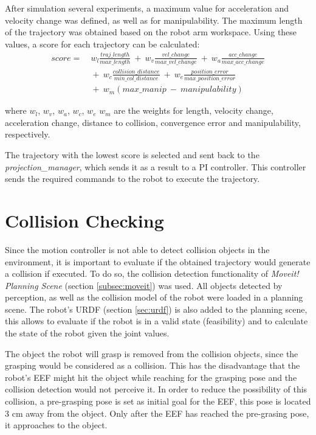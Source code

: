 After simulation several experiments, a maximum value for acceleration and velocity change was defined, as well as for manipulability. The maximum length of the trajectory was obtained based on the robot arm workspace. Using these values, a score for each trajectory can be calculated:
\begin{equation}
\begin{aligned}
score = &\ w_l\frac{traj\_length}{max\_length}\ +\ w_v\frac{vel\_change}{max\_vel\_change}\ +\ w_a\frac{acc\_change}{max\_acc\_change} \\
 & \ +\ w_c\frac{collision\_distance}{min\_col\_distance} 
\ +\ w_e\frac{position\_error}{max\_position\_error}\\
 & \ +\ w_m(max\_manip\ -\ manipulability)
\end{aligned}
\label{eq:score}
\end{equation}


where $w_l$, $w_v$, $w_a$, $w_c$, $w_e$ $w_m$ are the weights for length, velocity change, acceleration change, distance to collision, convergence error and manipulability, respectively.

The trajectory with the lowest score is selected and sent back to the \textit{projection\_manager}, which sends it as a result to a PI controller. This controller sends the required commands to the robot to execute the trajectory.


\section{Collision Checking}
\label{sec:collision}
Since the motion controller is not able to detect collision objects in the environment, it is important to evaluate if the obtained trajectory would generate a collision if executed. To do so, the collision detection functionality of \textit{Moveit! Planning Scene} (section \ref{subsec:moveit}) was used. All objects detected by perception, as well as the collision model of the robot were loaded in a planning scene. The robot's URDF (section \ref{sec:urdf}) is also added to the planning scene, this allows to evaluate if the robot is in a valid state (feasibility) and to calculate the state of the robot given the joint values.

The object the robot will grasp is removed from the collision objects, since the grasping would be considered as a collision. This has the disadvantage that the robot's EEF might hit the object while reaching for the grasping pose and the collision detection would not perceive it. In order to reduce the possibility of this collision, a pre-grasping pose is set as initial goal for the EEF, this pose is located 3 cm away from the object. Only after the EEF has reached the pre-grasing pose, it approaches to the object.

